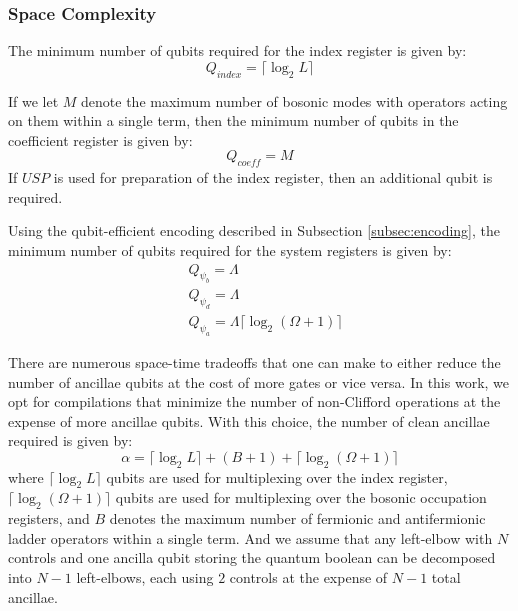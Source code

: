 \subsubsection{Space Complexity}
\label{subsubsec:space}

The minimum number of qubits required for the index register is given by:
\begin{equation}
    Q_{\textit{index}} = \lceil \log_2{L} \rceil
\end{equation}

If we let $M$ denote the maximum number of bosonic modes with operators acting on them within a single term, then the minimum number of qubits in the coefficient register is given by:
\begin{equation}
    Q_{\textit{coeff}} = M 
\end{equation} 
If $USP$ is used for preparation of the index register, then an additional qubit is required.

Using the qubit-efficient encoding described in Subsection \ref{subsec:encoding}, the minimum number of qubits required for the system registers is given by:
\begin{equation}
    \begin{split}
        &Q_{\psi_b} = \Lambda \\
        &Q_{\psi_d} = \Lambda \\
        &Q_{\psi_a} = \Lambda \lceil \log_2{(\Omega + 1)} \rceil
    \end{split}
\end{equation} 

There are numerous space-time tradeoffs that one can make to either reduce the number of ancillae qubits at the cost of more gates or vice versa.
In this work, we opt for compilations that minimize the number of non-Clifford operations at the expense of more ancillae qubits.
With this choice, the number of clean ancillae required is given by:
\begin{equation}
    \alpha = \lceil \log_2{L} \rceil + (B + 1) + \lceil \log_2{(\Omega + 1)} \rceil
\end{equation}
where $\lceil \log_2{L} \rceil$ qubits are used for multiplexing over the index register, $ \lceil \log_2{(\Omega + 1)} \rceil$ qubits are used for multiplexing over the bosonic occupation registers, and $B$ denotes the maximum number of fermionic and antifermionic ladder operators within a single term.
And we assume that any left-elbow with $N$ controls and one ancilla qubit storing the quantum boolean can be decomposed into $N-1$ left-elbows, each using $2$ controls at the expense of $N-1$ total ancillae.

